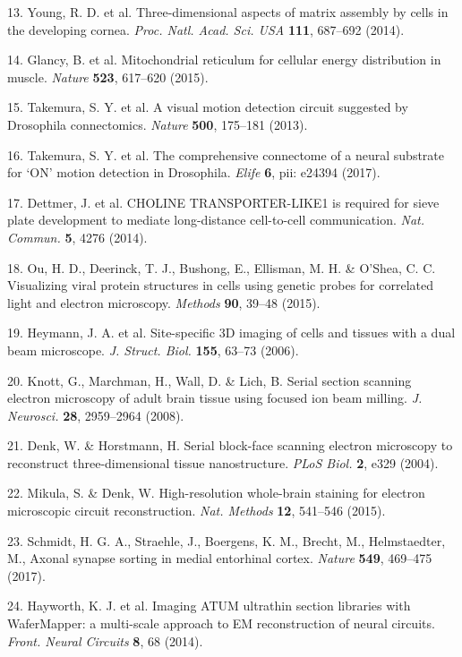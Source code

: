 \documentclass{article}
\begin{document}
\begin{hangpars}
13. Young, R. D. et al. Three-dimensional aspects of matrix assembly by cells in the developing cornea. \emph{Proc. Natl. Acad. Sci. USA} \textbf{111}, 687–692 (2014).

14. Glancy, B. et al. Mitochondrial reticulum for cellular energy distribution in muscle. \emph{Nature} \textbf{523}, 617–620 (2015).

15. Takemura, S. Y. et al. A visual motion detection circuit suggested by Drosophila connectomics. \emph{Nature} \textbf{500}, 175–181 (2013).

16. Takemura, S. Y. et al. The comprehensive connectome of a neural substrate for ‘ON’ motion detection in Drosophila. \emph{Elife} \textbf{6}, pii: e24394 (2017).

17. Dettmer, J. et al. CHOLINE TRANSPORTER-LIKE1 is required for sieve plate development to mediate long-distance cell-to-cell communication. \emph{Nat. Commun.} \textbf{5}, 4276 (2014).

18. Ou, H. D., Deerinck, T. J., Bushong, E., Ellisman, M. H. \& O’Shea, C. C. Visualizing viral protein structures in cells using genetic probes for correlated light and electron microscopy. \emph{Methods} \textbf{90}, 39–48 (2015).

19. Heymann, J. A. et al. Site-specific 3D imaging of cells and tissues with a dual beam microscope. \emph{J. Struct. Biol.} \textbf{155}, 63–73 (2006).

20. Knott, G., Marchman, H., Wall, D. \& Lich, B. Serial section scanning electron microscopy of adult brain tissue using focused ion beam milling. \emph{J. Neurosci.} \textbf{28}, 2959–2964 (2008).

21. Denk, W. \& Horstmann, H. Serial block-face scanning electron microscopy to reconstruct three-dimensional tissue nanostructure. \emph{PLoS Biol.} \textbf{2}, e329 (2004).

22. Mikula, S. \& Denk, W. High-resolution whole-brain staining for electron microscopic circuit reconstruction. \emph{Nat. Methods} \textbf{12}, 541–546 (2015).

23. Schmidt, H. G. A., Straehle, J., Boergens, K. M., Brecht, M., Helmstaedter, M., Axonal synapse sorting in medial entorhinal cortex. \emph{Nature} \textbf{549}, 469–475 (2017).

24. Hayworth, K. J. et al. Imaging ATUM ultrathin section libraries with WaferMapper: a multi-scale approach to EM reconstruction of neural circuits. \emph{Front. Neural Circuits} \textbf{8}, 68 (2014).


\end{hangpars}
\end{document}
